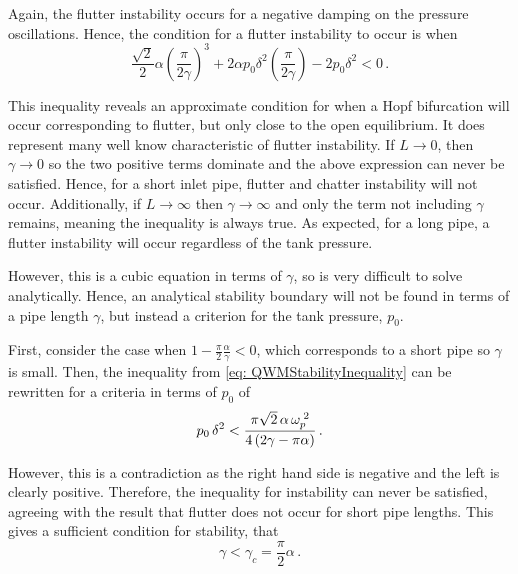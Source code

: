 Again, the flutter instability occurs for a negative damping on the pressure oscillations. Hence, the condition for a flutter instability to occur is when
~
\begin{equation} \label{eq: QWMStabilityInequality}
    \frac{\sqrt{2}}{2} \alpha \left( \frac{\pi}{2 \gamma} \right)^3 + 2 \alpha p_0 \delta^2 \left( \frac{\pi}{2 \gamma} \right) - 2 p_0 \delta^2 < 0 \, .
\end{equation}

This inequality reveals an approximate condition for when a Hopf bifurcation will occur corresponding to flutter, but only close to the open equilibrium. It does represent many well know characteristic of flutter instability. If $L \rightarrow 0$, then $\gamma \rightarrow 0$ so the two positive terms dominate and the above expression can never be satisfied. Hence, for a short inlet pipe, flutter and chatter instability will not occur. Additionally, if $L \rightarrow \infty$ then $\gamma \rightarrow \infty$ and only the term not including $\gamma$ remains, meaning the inequality is always true. As expected, for a long pipe, a flutter instability will occur regardless of the tank pressure.

However, this is a cubic equation in terms of $\gamma$, so is very difficult to solve analytically. Hence, an analytical stability boundary will not be found in terms of a pipe length $\gamma$, but instead a criterion for the tank pressure, $p_0$.

First, consider the case when $1 - \frac{\pi}{2} \frac{\alpha}{\gamma} < 0$, which corresponds to a short pipe so $\gamma$ is small. Then, the inequality from \cref{eq: QWMStabilityInequality} can be rewritten for a criteria in terms of $p_0$ of
~
\begin{equation*}
    p_0 \, \delta^2 < \frac{\pi \sqrt{2} \, \alpha \, \omega_p^{\;2}}{4 \left( 2 \gamma - \pi \alpha \right)} \, .
\end{equation*}

However, this is a contradiction as the right hand side is negative and the left is clearly positive. Therefore, the inequality for instability can never be satisfied, agreeing with the result that flutter does not occur for short pipe lengths. This gives a sufficient condition for stability, that
~
\begin{equation} \label{eq: CritPipeLength}
\gamma < \gamma_c = \frac{\pi}{2} \alpha \, .
\end{equation}

